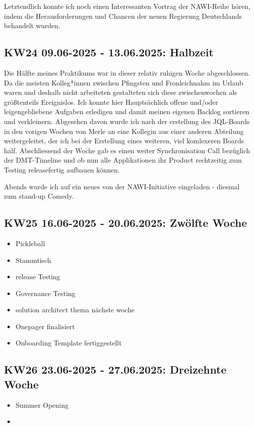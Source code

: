 Letztendlich konnte ich noch einen Interessanten Vortrag der \ac{NAWI}-Reihe hören, indem die Herausforderungen und Chancen der neuen Regierung Deutschlands behandelt wurden.


\subsection{KW24 09.06-2025 - 13.06.2025: Halbzeit}
Die Hälfte meines Praktikums war in dieser relativ ruhigen Woche abgeschlossen. 
Da die meisten Kolleg*innen zwischen Pfingsten und Fronleichnahm im Urlaub waren und deshalb nicht arbeiteten gestalteten sich diese zwischenwochen als größtenteils Ereignislos.
Ich konnte hier Hauptsächlich offene und/oder leigengebliebene Aufgaben erledigen und damit meinen eigenen Backlog sortieren und verkleinern.
Abgesehen davon wurde ich nach der erstellung des \ac{JQL}-Boards in den vorigen Wochen von Merle an eine Kollegin aus einer anderen Abteilung weitergeleitet, der ich bei der Erstellung eines weiteren, viel komlexeren Boards half.
Abschliessend der Woche gab es einen weiter Synchronisation Call bezüglich der \ac{DMT}-Timeline und ob nun alle Applikationen ihr Product rechtzeitig zum Testing releasefertig aufbauen können.

Abends wurde ich auf ein neues von der \ac{NAWI}-Initiative eingeladen - diesmal zum stand-up Comedy.


\subsection{KW25 16.06-2025 - 20.06.2025: Zwölfte Woche}
\begin{itemize}
  \item Pickleball
  \item Stammtisch
  \item release Testing
  \item Governance Testing
  \item solution architect thema nächste woche
  \item Onepager finalisiert
  \item Onboarding Template fertiggestellt
\end{itemize}


\subsection{KW26 23.06-2025 - 27.06.2025: Dreizehnte Woche}
\begin{itemize}
  \item Summer Opening
  \item 
\end{itemize}



